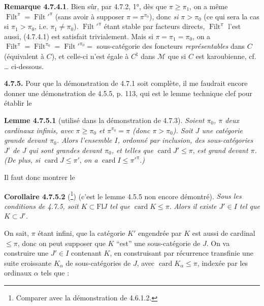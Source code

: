 \documentclass[11pt]{article}
\newcommand{\printedpage}[1]{\marginpar{\footnotesize p.~#1}}
\newcommand{\msp}[1]{\marginpar{\footnotesize [#1]}}
\newcommand{\Filt}{\operatorname{Filt}}
\newcommand{\card}{\operatorname{card}}
\begin{document}
\textbf{Remarque 4.7.4.1}. Bien sûr, par 4.7.2, 1°, dès que $\pi \geqslant \pi_1$, on a même $\Filt^{\pi} = \Filt'^{\pi}$ (sans avoir à supposer $\pi = \pi^{\pi_0}$), donc \textit{si} $\pi > \pi_0$ (ce qui sera la cas si $\pi_1 > \pi_0$, i.e. $\pi_1 \neq \pi_0$). $\Filt'^{\pi}$ étant stable par facteurs directs, $\Filt^{\pi}$ l’est aussi, (4.7.4.1) est satisfait trivialement. Mais si $\pi = \pi_1 = \pi_0$, on a $\Filt^{\pi} = \Filt^{\pi_0} = \Filt'^{\pi_0} =$ sous-catégorie des foncteurs \textit{représentables} dans $C$ (équivalent à $C$), et celle-ci n’est égale à $C^{\natural}$ dans $\mathcal{M}$ que si $C$ est karoubienne, cf. \ldots{} ci-dessous. %

\printedpage{56}

\msp{page 168}
\textbf{4.7.5.} Pour que la démonstration de 4.7.1 soit complète, il me faudrait encore donner une démonstration de 4.5.5, p. 113, qui est le lemme technique clef pour établir le

\textbf{Lemme 4.7.5.1} (utilisé dans la démonstration de 4.7.3). \textit{Soient $\pi_0$, $\pi$ deux cardinaux infinis, avec $\pi \geqslant \pi_0$ et $\pi^{\pi_0} = \pi$ (donc $\pi > \pi_0$). Soit $J$ une catégorie grande devant $\pi_0$. Alors l’ensemble $I$, ordonné par inclusion, des sous-catégories $J'$ de $J$ qui sont grandes devant $\pi_0$, et telles que} $\card J' \leqslant \pi$, \textit{est grand devant $\pi$. (De plus, si} $\card J \leqslant \pi'$, \textit{on a} $\card I \leqslant \pi'^{\pi}$\textit{.)}

Il faut donc montrer le

\textbf{Corollaire 4.7.5.2} (\footnote[70]{Comparer avec la démonstration de 4.6.1.2.}) (c’est le lemme 4.5.5 non encore démontré). \textit{Sous les conditions de 4.7.5, soit $K \subset \mathrm{Fl} J$ tel que} $\card K \leqslant \pi$. \textit{Alors il existe $J' \in I$ tel que $K \subset J'$.}

On sait, $\pi$ étant infini, que la catégorie $K'$ engendrée par $K$ est aussi de cardinal $\leqslant \pi$, donc on peut supposer que $K$ “est” une sous-catégorie de $J$. On va construire une $J' \in I$ contenant $K$, en construisant par récurrence transfinie une suite croissante $K_{\alpha}$ de sous-catégories de $J$, avec $\card K_{\alpha} \leqslant \pi$, indexée par les ordinaux $\alpha$ tels que \fbox{$\card \alpha \leqslant \pi$} :
\end{document}
